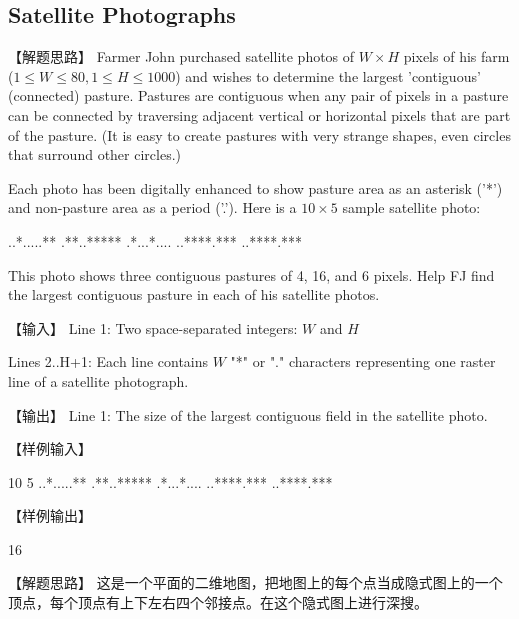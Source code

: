 \subsection{Satellite Photographs}

【解题思路】
Farmer John purchased satellite photos of $W \times H$ pixels of his farm ($1 \leq W \leq 80, 1 \leq H \leq 1000$) and wishes to determine the largest 'contiguous' (connected) pasture. Pastures are contiguous when any pair of pixels in a pasture can be connected by traversing adjacent vertical or horizontal pixels that are part of the pasture. (It is easy to create pastures with very strange shapes, even circles that surround other circles.)

Each photo has been digitally enhanced to show pasture area as an asterisk ('*') and non-pasture area as a period ('.'). Here is a $10 \times 5$ sample satellite photo:
\begin{Code}
    ..*.....**
    .**..*****
    .*...*....
    ..****.***
    ..****.***
\end{Code}

This photo shows three contiguous pastures of 4, 16, and 6 pixels. Help FJ find the largest contiguous pasture in each of his satellite photos.


【输入】
Line 1: Two space-separated integers: $W$ and $H$

Lines 2..H+1: Each line contains $W$ "*" or "." characters representing one raster line of a satellite photograph.


【输出】
Line 1: The size of the largest contiguous field in the satellite photo.


【样例输入】
\begin{Code}
    10 5
    ..*.....**
    .**..*****
    .*...*....
    ..****.***
    ..****.***
\end{Code}


【样例输出】
\begin{Code}    
    16
\end{Code}


【解题思路】
这是一个平面的二维地图，把地图上的每个点当成隐式图上的一个顶点，每个顶点有上下左右四个邻接点。在这个隐式图上进行深搜。




